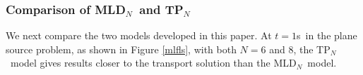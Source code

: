 \documentclass[review]{elsarticle}
\newcommand{\pn}{P$_N$}
\newcommand{\dn}{D$_N$}
\newcommand{\tp}[1]{TP$_{#1}$}
\begin{document}

\subsubsection{Comparison of ML\dn\ and \tp{N}}
We next compare the two models developed in this paper.  At $t = 1$s\ in the plane source problem, as shown in Figure \ref{mlfls}, with both $N=6$ and $8$, the T\pn~model gives results closer to the transport solution than the ML\dn~model. %
\end{document}
